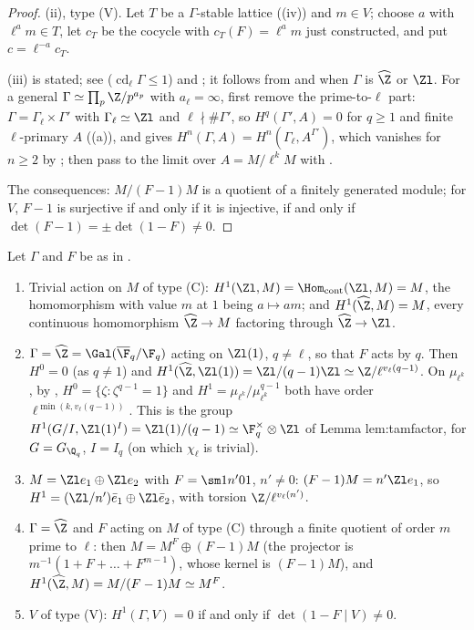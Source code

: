 \begin{proof}
(ii), type (V). Let $T$ be a $\Gamma$-stable lattice ((iv)) and $m\in V$; choose $a$ with $\ell^am\in T$, let $c_T$ be the cocycle with
$c_T(F)=\ell^am$ just constructed, and put $c=\ell^{-a}c_T$.

(iii) is stated; see \cite[Chapter I, Sections 3 and 4]{SerreGaloisCoh} ($\operatorname{cd}_\ell\Gamma\le1$) and \cite[Section 2]{Tate95}; it follows from
 and  when $\Gamma$ is $\widehat\Z$ or $\Zl$. For a general $\Gamma\simeq\prod_p\Z/p^{a_p}$ with $a_\ell=\infty$,
first remove the prime-to-$\ell$ part: $\Gamma=\Gamma_\ell\times\Gamma'$ with $\Gamma_\ell\simeq\Zl$ and $\ell\nmid\#\Gamma'$, so $H^q(\Gamma',A)=0$ for $q\ge1$ and finite $\ell$-primary $A$
((a)), and  gives $H^n(\Gamma,A)=H^n(\Gamma_\ell,A^{\Gamma'})$, which vanishes for $n\ge2$ by
; then pass to the limit over $A=M/\ell^kM$ with .

The consequences: $M/(F-1)M$ is a quotient of a finitely generated module; for $V$, $F-1$ is surjective if and only if it is injective, if and only if
$\det(F-1)=\pm\det(1-F)\ne0$.
\end{proof}

\begin{example}\label{ex:cohomology:procyclic-examples}
Let $\Gamma$ and $F$ be as in .
\begin{enumerate}[label=(\roman*)]
\item Trivial action on $M$ of type (C): $H^1(\Zl,M)=\Hom_{\mathrm{cont}}(\Zl,M)=M$, the homomorphism with value $m$ at $1$ being $a\mapsto am$; and
$H^1(\widehat\Z,M)=M$, every continuous homomorphism $\widehat\Z\to M$ factoring through $\widehat\Z\to\Zl$.
\item $\Gamma=\widehat\Z=\Gal(\overline\F_q/\F_q)$ acting on $\Zl(1)$, $q\ne\ell$, so that $F$ acts by $q$. Then $H^0=0$ (as $q\ne1$) and
$H^1(\widehat\Z,\Zl(1))=\Zl/(q-1)\Zl\simeq\Z/\ell^{v_\ell(q-1)}$. On $\mu_{\ell^k}$, by , $H^0=\{\zeta:\zeta^{q-1}=1\}$ and
$H^1=\mu_{\ell^k}/\mu_{\ell^k}^{q-1}$ both have order $\ell^{\min(k,v_\ell(q-1))}$. This is the group $H^1(G/I,\Zl(1)^I)=\Zl(1)/(q-1)\simeq\F_q^\times\otimes\Zl$ of Lemma
lem:tamfactor, for $G=G_{\Q_q}$, $I=I_q$ (on which $\chi_\ell$ is trivial).
\item $M=\Zl e_1\oplus\Zl e_2$ with $F=\sm1{n'}01$, $n'\ne0$: $(F-1)M=n'\Zl e_1$, so $H^1=(\Zl/n')\bar e_1\oplus\Zl\bar e_2$, with torsion $\Z/\ell^{v_\ell(n')}$.
\item $\Gamma=\widehat\Z$ and $F$ acting on $M$ of type (C) through a finite quotient of order $m$ prime to $\ell$: then $M=M^F\oplus(F-1)M$ (the projector is
$m^{-1}(1+F+\dots+F^{m-1})$, whose kernel is $(F-1)M$), and $H^1(\widehat\Z,M)=M/(F-1)M\simeq M^F$.
\item $V$ of type (V): $H^1(\Gamma,V)=0$ if and only if $\det(1-F\mid V)\ne0$.
\end{enumerate}
\end{example}

